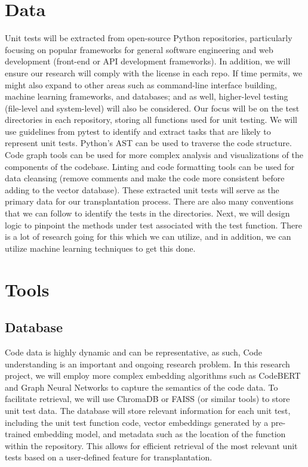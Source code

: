 \documentclass[sigconf]{acmart}
\begin{document}
\section{Data}
Unit tests will be extracted from open-source Python repositories, particularly focusing on popular frameworks for general software engineering and web development (front-end or API development frameworks). In addition, we will ensure our research will comply with the license in each repo. If time permits, we might also expand to other areas such as command-line interface building, machine learning frameworks, and databases; and as well, higher-level testing (file-level and system-level) will also be considered. Our focus will be on the test directories in each repository, storing all functions used for unit testing. We will use guidelines from pytest to identify and extract tasks that are likely to represent unit tests. Python's AST can be used to traverse the code structure. Code graph tools can be used for more complex analysis and visualizations of the components of the codebase. Linting and code formatting tools can be used for data cleansing (remove comments and make the code more consistent before adding to the vector database). These extracted unit tests will serve as the primary data for our transplantation process. There are also many conventions that we can follow to identify the tests in the directories. Next, we will design logic to pinpoint the methods under test associated with the test function. There is a lot of research going for this which we can utilize, and in addition, we can utilize machine learning techniques to get this done.


\section{Tools}
\subsection{Database}
Code data is highly dynamic and can be representative, as such, Code understanding is an important and ongoing research problem. In this research project, we will employ more complex embedding algorithms such as CodeBERT and Graph Neural Networks to capture the semantics of the code data. To facilitate retrieval, we will use ChromaDB or FAISS (or similar tools) to store unit test data. The database will store relevant information for each unit test, including the unit test function code, vector embeddings generated by a pre-trained embedding model, and metadata such as the location of the function within the repository. This allows for efficient retrieval of the most relevant unit tests based on a user-defined feature for transplantation.
\end{document}
